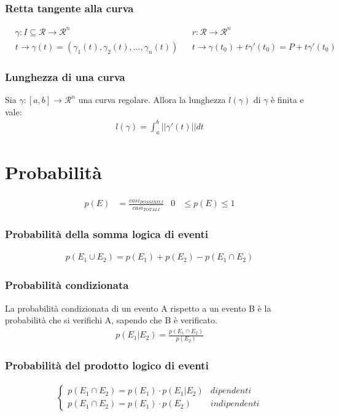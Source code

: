 \documentclass[a4paper]{article}
\begin{document}
	\subsubsection{Retta tangente alla curva}
	\begin{align*}
		&\gamma: I \subseteq \mathcal{R} \to \mathcal{R}^n	&	&r: \mathcal{R} \to \mathcal{R}^n\\
		&t \to \gamma (t) = (\gamma_1 (t),\gamma_2 (t),...,\gamma_n (t))	&	&t \to \gamma (t_0) + t\gamma' (t_0) = P + t\gamma' (t_0)
	\end{align*}
	\subsubsection{Lunghezza di una curva}
	Sia $\gamma : [a,b] \to \mathcal{R}^n$ una curva regolare. Allora la lunghezza $l(\gamma)$ di $\gamma$ è finita e vale:
	\begin{align*}
		l(\gamma) = \int_{a}^{b} || \gamma'(t) ||dt
	\end{align*}
	
	\newpage
	\section{Probabilità}
	\begin{align*}
		p(E) & = \frac{casi_{POSSIBILI}}{casi_{TOTALI}} & 0 & \le p(E) \le 1
	\end{align*}
	
	\subsubsection{Probabilità della somma logica di eventi}
	\begin{align*}
		p(E_1 \cup E_2) = p(E_1) + p(E_2) - p(E_1 \cap E_2)
	\end{align*}
	
	\subsubsection{Probabilità condizionata}
	La probabilità condizionata di un evento A rispetto a un evento B è la probabilità che si verifichi A, sapendo che B è verificato.
	\begin{align*}
		p(E_1 | E_2) = \frac{p(E_1 \cap E_2)}{p(E_2)}
	\end{align*}
	
	\subsubsection{Probabilità del prodotto logico di eventi}
	\begin{align*}
		\begin{cases}
		p(E_1 \cap E_2) = p(E_1) \cdot p(E_1 | E_2)	& dipendenti\\
		p(E_1 \cap E_2) = p(E_1) \cdot p(E_2)		& indipendenti
		\end{cases}
	\end{align*}
	
\end{document}
